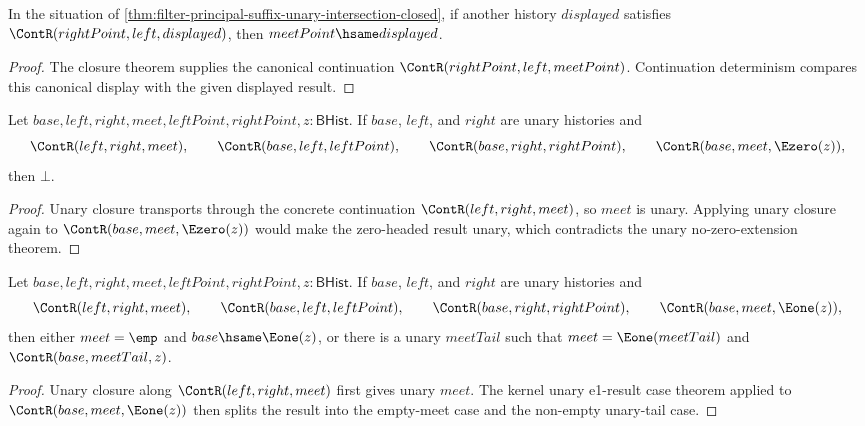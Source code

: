 \begin{theorem}
\label{thm:filter-principal-suffix-unary-intersection-result-deterministic}
In the situation of
\autoref{thm:filter-principal-suffix-unary-intersection-closed}, if another
history $displayed$ satisfies $\ContR(rightPoint,left,displayed)$, then
$meetPoint \hsame displayed$.
\end{theorem}
\begin{proof}
The closure theorem supplies the canonical continuation
$\ContR(rightPoint,left,meetPoint)$. Continuation determinism compares this
canonical display with the given displayed result.
\end{proof}

\begin{theorem}
\label{thm:filter-principal-suffix-unary-intersection-zero-result-absurd}
Let $base,left,right,meet,leftPoint,rightPoint,z:\mathsf{BHist}$. If
$base$, $left$, and $right$ are unary histories and
$$
\ContR(left,right,meet),\qquad
\ContR(base,left,leftPoint),\qquad
\ContR(base,right,rightPoint),\qquad
\ContR(base,meet,\Ezero(z)),
$$
then $\bot$.
\end{theorem}
\begin{proof}
Unary closure transports through the concrete continuation
$\ContR(left,right,meet)$, so $meet$ is unary. Applying unary closure again to
$\ContR(base,meet,\Ezero(z))$ would make the zero-headed result unary, which
contradicts the unary no-zero-extension theorem.
\end{proof}

\begin{theorem}
\label{thm:filter-principal-suffix-unary-intersection-e1-result-cases}
Let $base,left,right,meet,leftPoint,rightPoint,z:\mathsf{BHist}$. If
$base$, $left$, and $right$ are unary histories and
$$
\ContR(left,right,meet),\qquad
\ContR(base,left,leftPoint),\qquad
\ContR(base,right,rightPoint),\qquad
\ContR(base,meet,\Eone(z)),
$$
then either $meet=\emp$ and $base\hsame\Eone(z)$, or there is a unary
$meetTail$ such that $meet=\Eone(meetTail)$ and
$\ContR(base,meetTail,z)$.
\end{theorem}
\begin{proof}
Unary closure along $\ContR(left,right,meet)$ first gives unary $meet$. The
kernel unary e1-result case theorem applied to
$\ContR(base,meet,\Eone(z))$ then splits the result into the empty-meet case
and the non-empty unary-tail case.
\end{proof}

